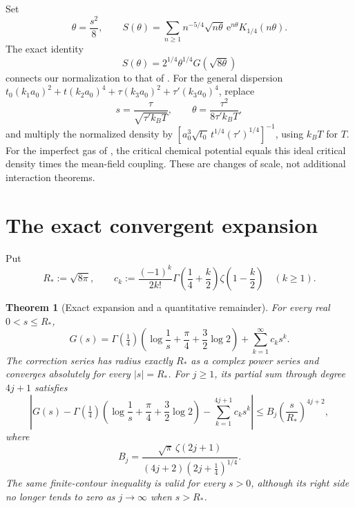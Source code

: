 \documentclass[11pt,a4paper]{article}
\numberwithin{equation}{section}
\newtheorem{theorem}{Theorem}[section]
\theoremstyle{definition}
\newcommand{\e}{\mathrm e}
\newcommand{\gfour}{\Gamma(\tfrac14)}
\begin{document}
Set
\begin{equation}
 \theta=\frac{s^2}{8},\qquad
 S(\theta)=\sum_{n\ge1}n^{-5/4}
 \sqrt{n\theta}\,\e^{n\theta}K_{1/4}(n\theta).
 \label{eq:Stheta}
\end{equation}
The exact identity
\begin{equation}
 S(\theta)=2^{1/4}\theta^{1/4}G(\sqrt{8\theta})
 \label{eq:Smap}
\end{equation}
connects our normalization to that of \cite{LJ2020}. For the general
dispersion $t_0(k_1a_0)^2+t(k_2a_0)^4+\tau(k_3a_0)^2+
\tau'(k_3a_0)^4$, replace
\begin{equation}
 s=\frac\tau{\sqrt{\tau' k_BT}},\qquad
 \theta=\frac{\tau^2}{8\tau' k_BT},
 \label{eq:units}
\end{equation}
and multiply the normalized density by
$[a_0^3\sqrt{t_0}\,t^{1/4}(\tau')^{1/4}]^{-1}$, using $k_BT$ for $T$.
For the imperfect gas of \cite{LJ2020}, the critical chemical potential
equals this ideal critical density times the mean-field coupling.
These are changes of scale, not additional interaction theorems.

\section{The exact convergent expansion}
\label{sec:main}

Put
\begin{equation}
 R_*:=\sqrt{8\pi},\qquad
 c_k:=\frac{(-1)^k}{2k!}\Gamma\left(\frac14+\frac k2\right)
                  \zeta\left(1-\frac k2\right)\quad(k\ge1).
 \label{eq:coeffs}
\end{equation}

\begin{theorem}[Exact expansion and a quantitative remainder]
\label{thm:main}
For every real $0<s\le R_*$,
\begin{equation}
 G(s)=\gfour\left(\log\frac1s+\frac\pi4+\frac32\log2\right)
       +\sum_{k=1}^{\infty}c_k s^k.
 \label{eq:main}
\end{equation}
The correction series has radius exactly $R_*$ as a complex power
series and converges absolutely for every $|s|=R_*$. For $j\ge1$, its
partial sum through degree $4j+1$ satisfies
\begin{equation}
 \left|G(s)-\gfour\left(\log\frac1s+\frac\pi4+\frac32\log2\right)
              -\sum_{k=1}^{4j+1}c_k s^k\right|
 \le B_j\left(\frac{s}{R_*}\right)^{4j+2},
 \label{eq:blockbound}
\end{equation}
where
\begin{equation}
 B_j=\frac{\sqrt\pi\,\zeta(2j+1)}
 {(4j+2)(2j+\tfrac14)^{1/4}}.
 \label{eq:Bj}
\end{equation}
The same finite-contour inequality is valid for every $s>0$, although its
right side no longer tends to zero as $j\to\infty$ when $s>R_*$.
\end{theorem}
\end{document}
